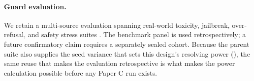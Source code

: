 \paragraph{Guard evaluation.}
We retain a multi-source evaluation spanning real-world toxicity, jailbreak,
over-refusal, and safety stress suites \citep{lin2023toxicchat,chao2024jailbreakbench,
rottger2024xstest,han2024wildguard,cui2024orbench,mazeika2024harmbench}. The
benchmark panel is used retrospectively; a future confirmatory claim requires a
separately sealed cohort. Because the parent suite also supplies the seed variance
that sets this design's resolving power (), the same reuse that
makes the evaluation retrospective is what makes the power calculation possible
before any Paper C run exists.


